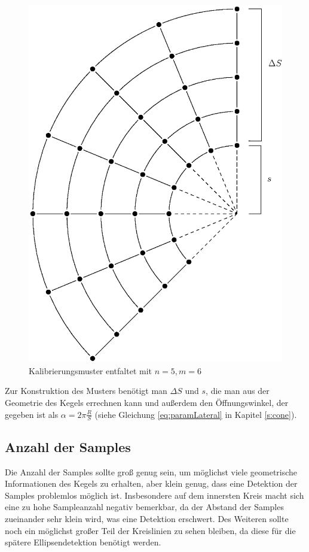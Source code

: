 \begin{figure}[!htb]
	\centering
	\includegraphics[scale=.7]{images/calibrationPattern2.eps}
	\caption{Kalibrierungsmuster entfaltet mit $n = 5, m = 6$}
	\label{fig:calibrationPattern}
\end{figure}

Zur Konstruktion des Musters benötigt man $\Delta S$ und $s$, die man aus der Geometrie des Kegels errechnen kann und außerdem den Öffnungswinkel, der gegeben ist als $\alpha = 2\pi\frac{R}{S}$ (siehe Gleichung \ref{eq:paramLateral} in Kapitel \ref{s:cone}).

\subsection{Anzahl der Samples}
Die Anzahl der Samples sollte groß genug sein, um möglichst viele geometrische Informationen des Kegels zu erhalten, aber klein genug, dass eine Detektion der Samples problemlos möglich ist. Insbesondere auf dem innersten Kreis macht sich eine zu hohe Sampleanzahl negativ bemerkbar, da der Abstand der Samples zueinander sehr klein wird, was eine Detektion erschwert. Des Weiteren sollte noch ein möglichst großer Teil der Kreislinien zu sehen bleiben, da diese für die spätere Ellipsendetektion benötigt werden.


